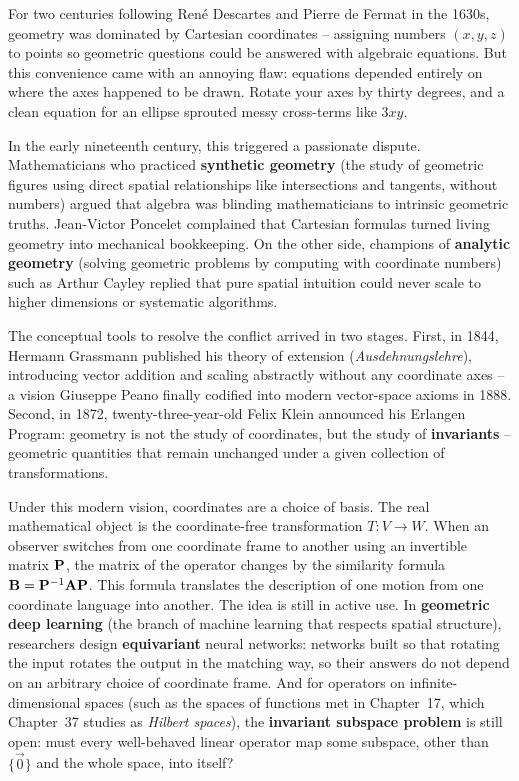 \begin{historybox}
For two centuries following Ren\'e Descartes and Pierre de Fermat in the 1630s, geometry was dominated by Cartesian coordinates -- assigning numbers $(x,y,z)$ to points so geometric questions could be answered with algebraic equations. But this convenience came with an annoying flaw: equations depended entirely on where the axes happened to be drawn. Rotate your axes by thirty degrees, and a clean equation for an ellipse sprouted messy cross-terms like $3xy$.

In the early nineteenth century, this triggered a passionate dispute. Mathematicians who practiced \textbf{synthetic geometry} (the study of geometric figures using direct spatial relationships like intersections and tangents, without numbers) argued that algebra was blinding mathematicians to intrinsic geometric truths. Jean-Victor Poncelet complained that Cartesian formulas turned living geometry into mechanical bookkeeping. On the other side, champions of \textbf{analytic geometry} (solving geometric problems by computing with coordinate numbers) such as Arthur Cayley replied that pure spatial intuition could never scale to higher dimensions or systematic algorithms.

The conceptual tools to resolve the conflict arrived in two stages. First, in 1844, Hermann Grassmann published his theory of extension (\emph{Ausdehnungslehre}), introducing vector addition and scaling abstractly without any coordinate axes -- a vision Giuseppe Peano finally codified into modern vector-space axioms in 1888. Second, in 1872, twenty-three-year-old Felix Klein announced his Erlangen Program: geometry is not the study of coordinates, but the study of \textbf{invariants} -- geometric quantities that remain unchanged under a given collection of transformations.

Under this modern vision, coordinates are a choice of basis. The real mathematical object is the coordinate-free transformation $T: V \to W$. When an observer switches from one coordinate frame to another using an invertible matrix $\mathbf{P}$, the matrix of the operator changes by the similarity formula $\mathbf{B} = \mathbf{P}^{-1} \mathbf{A} \mathbf{P}$. This formula translates the description of one motion from one coordinate language into another. The idea is still in active use. In \textbf{geometric deep learning} (the branch of machine learning that respects spatial structure), researchers design \textbf{equivariant} neural networks: networks built so that rotating the input rotates the output in the matching way, so their answers do not depend on an arbitrary choice of coordinate frame. And for operators on infinite-dimensional spaces (such as the spaces of functions met in Chapter~17, which Chapter~37 studies as \emph{Hilbert spaces}), the \textbf{invariant subspace problem} is still open: must every well-behaved linear operator map some subspace, other than $\{\vec{0}\}$ and the whole space, into itself?
\end{historybox}

